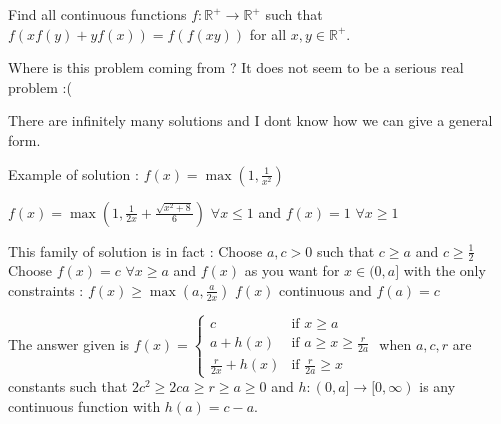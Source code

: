 \begin{solution}
	\begin{tcolorbox}Find all continuous functions $f: \mathbb{R^+} \to \mathbb{R}^+$ such that $f(xf(y)+yf(x))=f(f(xy))$ for all $x,y \in \mathbb{R^+}$.\end{tcolorbox}
Where is this problem coming from ?
It does not seem to be a serious real problem :(

There are infinitely many solutions and I dont know how we can give a general form.

Example of solution : 
$f(x)=\max(1,\frac 1{x^2})$

$f(x)=\max(1,\frac 1{2x}+\frac{\sqrt{x^2+8}}6)$ $\forall x\le 1$ and $f(x)=1$ $\forall x\ge 1$

This family of solution is in fact :
Choose $a,c>0$ such that $c\ge a$ and $c\ge \frac 12$
Choose $f(x)=c$ $\forall x\ge a$ and $f(x)$ as you want for $x\in(0,a]$ with the only constraints :
$f(x)\ge \max(a,\frac a{2x})$
$f(x)$ continuous and $f(a)=c$
\end{solution}



\begin{solution}
	The answer given is $ f(x) =\begin{cases}c &\mbox{if }x\geq a\\ a+h(x) &\mbox{if }a\geq x\geq\frac{r}{2a}\\ \frac{r}{2x}+h(x) &\mbox{if }\frac{r}{2a}\geq x\end{cases} $ when $a,c,r$ are constants such that $2c^2 \ge 2ca \ge r \ge a \ge 0$ and $h: (0,a] \to [0, \infty)$ is any continuous function with $h(a)=c-a$.
\end{solution}



